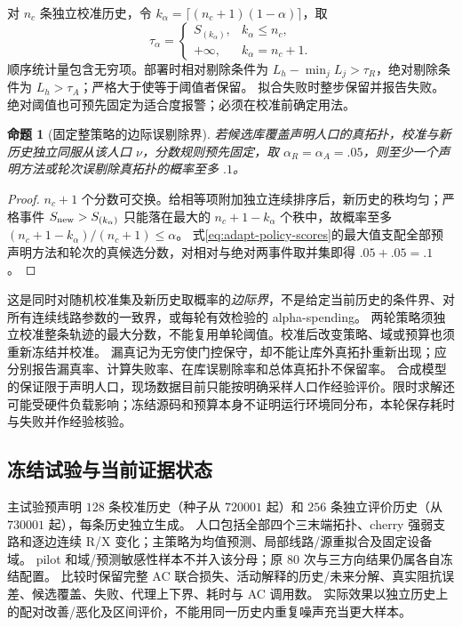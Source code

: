 \documentclass[UTF8,fontset=fandol,11pt,a4paper]{ctexart}
\newtheorem{proposition}{命题}
\begin{document}
对 $n_c$ 条独立校准历史，令 $k_\alpha=\lceil(n_c+1)(1-\alpha)\rceil$，取
\begin{equation}
 \tau_\alpha=\begin{cases}S_{(k_\alpha)},&k_\alpha\le n_c,\\
 +\infty,&k_\alpha=n_c+1.
 \end{cases}
 \label{eq:adapt-quantile}
\end{equation}
顺序统计量包含无穷项。部署时相对剔除条件为 $L_h-\min_jL_j>\tau_R$，绝对剔除条件为 $L_h>\tau_A$；严格大于使等于阈值者保留。
拟合失败时整步保留并报告失败。绝对阈值也可预先固定为适合度报警；必须在校准前确定用法。
\begin{proposition}[固定整策略的边际误剔除界]
若候选库覆盖声明人口的真拓扑，校准与新历史独立同服从该人口 $\nu$，分数规则预先固定，取 $\alpha_R=\alpha_A=.05$，则至少一个声明方法或轮次误剔除真拓扑的概率至多 $.1$。
\end{proposition}
\begin{proof}
$n_c+1$ 个分数可交换。给相等项附加独立连续排序后，新历史的秩均匀；严格事件 $S_{\rm new}>S_{(k_\alpha)}$ 只能落在最大的 $n_c+1-k_\alpha$ 个秩中，故概率至多 $(n_c+1-k_\alpha)/(n_c+1)\le\alpha$。
式\eqref{eq:adapt-policy-scores}的最大值支配全部预声明方法和轮次的真候选分数，对相对与绝对两事件取并集即得 $.05+.05=.1$。
\end{proof}
这是同时对随机校准集及新历史取概率的\emph{边际界}，不是给定当前历史的条件界、对所有连续线路参数的一致界，或每轮有效检验的 alpha-spending。
两轮策略须独立校准整条轨迹的最大分数，不能复用单轮阈值。校准后改变策略、域或预算也须重新冻结并校准。
漏真记为无穷使门控保守，却不能让库外真拓扑重新出现；应分别报告漏真率、计算失败率、在库误剔除率和总体真拓扑不保留率。
合成模型的保证限于声明人口，现场数据目前只能按明确采样人口作经验评价。限时求解还可能受硬件负载影响；冻结源码和预算本身不证明运行环境同分布，本轮保存耗时与失败并作经验核验。

\subsection{冻结试验与当前证据状态}
主试验预声明 $128$ 条校准历史（种子从 $720001$ 起）和 $256$ 条独立评价历史（从 $730001$ 起），每条历史独立生成。
人口包括全部四个三末端拓扑、cherry 强弱支路和逐边连续 R/X 变化；主策略为均值预测、局部线路/源重拟合及固定设备域。
pilot 和域/预测敏感性样本不并入该分母；原 80 次与三方向结果仍属各自冻结配置。
比较时保留完整 AC 联合损失、活动解释的历史/未来分解、真实阻抗误差、候选覆盖、失败、代理上下界、耗时与 AC 调用数。
实际效果以独立历史上的配对改善/恶化及区间评价，不能用同一历史内重复噪声充当更大样本。
\end{document}
